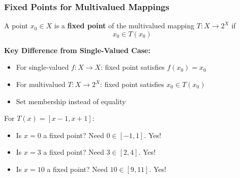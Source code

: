 \documentclass[aspectratio=169,10pt]{beamer}
\begin{document}
\begin{frame}
\frametitle{Fixed Points for Multivalued Mappings}

\begin{definition}
A point $x_0 \in X$ is a \textbf{fixed point} of the multivalued mapping $T: X \to 2^X$ if
\[
x_0 \in T(x_0)
\]
\end{definition}

\vspace{0.3cm}

\textbf{Key Difference from Single-Valued Case:}
\begin{itemize}
    \item For single-valued $f: X \to X$: fixed point satisfies $f(x_0) = x_0$
    \item For multivalued $T: X \to 2^X$: fixed point satisfies $x_0 \in T(x_0)$
    \item Set membership instead of equality
\end{itemize}

\vspace{0.3cm}

\begin{example}
For $T(x) = [x-1, x+1]$:
\begin{itemize}
    \item Is $x = 0$ a fixed point? Need $0 \in [-1, 1]$. \textcolor{green!50!black}{\checkmark Yes!}
    \item Is $x = 3$ a fixed point? Need $3 \in [2, 4]$. \textcolor{green!50!black}{\checkmark Yes!}
    \item Is $x = 10$ a fixed point? Need $10 \in [9, 11]$. \textcolor{green!50!black}{\checkmark Yes!}
\end{itemize}
\end{example}

\end{frame}
\end{document}
